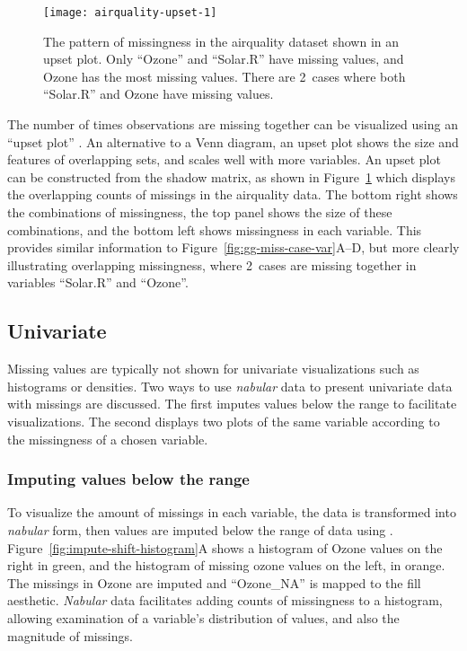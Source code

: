 \documentclass[article]{jss}
\begin{document}
\begin{figure}
\centering
\texttt{[image: airquality-upset-1]}
\caption[The pattern of missingness in the airquality dataset shown in an
upset plot]{The pattern of missingness in the airquality dataset shown in an
upset plot.  Only ``Ozone'' and ``Solar.R'' have missing values, and Ozone has the
most missing values.  There are 2~cases where both ``Solar.R'' and Ozone have
missing values.}\label{fig:airquality-upset}
\end{figure}

The number of times observations are missing together can be visualized
using an ``upset plot'' \citep{Conway2017}.  An alternative to a Venn
diagram, an upset plot shows the size and features of overlapping sets, and
scales well with more variables.  An upset plot can be constructed from the
shadow matrix, as shown in Figure~\ref{fig:airquality-upset} which displays
the overlapping counts of missings in the airquality data.  The bottom right
shows the combinations of missingness, the top panel shows the size of these
combinations, and the bottom left shows missingness in each variable.  This
provides similar information to Figure~\ref{fig:gg-miss-case-var}A--D, but
more clearly illustrating overlapping missingness, where 2~cases are missing
together in variables ``Solar.R'' and ``Ozone''.

\hypertarget{univariate}{%
\subsection{Univariate}\label{univariate}}

Missing values are typically not shown for univariate visualizations such as
histograms or densities.  Two ways to use \emph{nabular} data to present
univariate data with missings are discussed.  The first imputes values below
the range to facilitate visualizations.  The second displays two plots of
the same variable according to the missingness of a chosen variable.

\subsubsection{Imputing values below the range}

To visualize the amount of
missings in each variable, the data is transformed into \emph{nabular} form,
then values are imputed below the range of data using
.  Figure~\ref{fig:impute-shift-histogram}A shows a
histogram of Ozone values on the right in green, and the histogram of
missing ozone values on the left, in orange.  The missings in Ozone are
imputed and ``Ozone\_NA'' is mapped to the fill aesthetic.  \emph{Nabular}
data facilitates adding counts of missingness to a histogram, allowing
examination of a variable's distribution of values, and also the magnitude
of missings.
\end{document}
